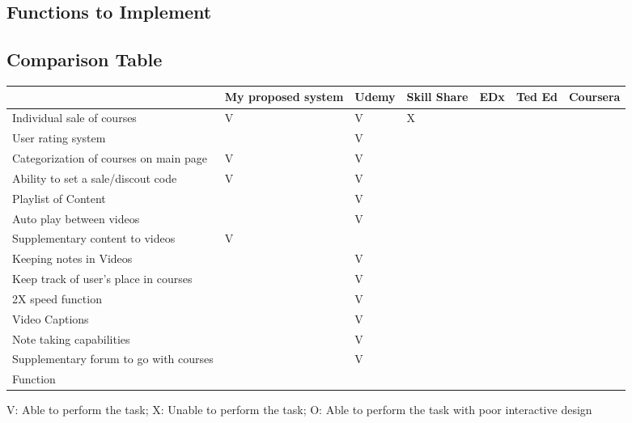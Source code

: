 \documentclass{article}
\begin{document}
\subsection{Functions to Implement}



\subsection{Comparison Table}
\begin{tabular}{ | m{10em} | m{2cm}| m{1cm} | m{1.5cm}| m{1cm} | m{1cm}| m{1.5cm} | } 
  \hline
   & My proposed system & Udemy & Skill Share & EDx & Ted Ed & Coursera\\ 
  \hline
  Individual sale of courses & V & V & X & & & \\ 
  \hline
  User rating system &  & V & & & & \\ 
  \hline
  Categorization of courses on main page & V & V & & & & \\ 
  \hline
  Ability to set a sale/discout code & V & V & & & & \\ 
  \hline
  Playlist of Content & & V & & & & \\ 
  \hline
  Auto play between videos & & V & & & & \\ 
  \hline
  Supplementary content to videos & V & & & & & \\ 
  \hline
  Keeping notes in Videos & & V & & & & \\ 
  \hline
  Keep track of user's place in courses & & V & & & & \\ 
  \hline
  2X speed function & & V & & & & \\ 
  \hline
  Video Captions & & V & & & & \\ 
  \hline
  Note taking capabilities & & V & & & & \\ 
  \hline
  Supplementary forum to go with courses & & V & & & & \\ 
  \hline
  Function & & & & & & \\ 
  \hline
\end{tabular}
V: Able to perform the task; X: Unable to perform the task; O: Able to perform the task with poor interactive design
\end{document}
